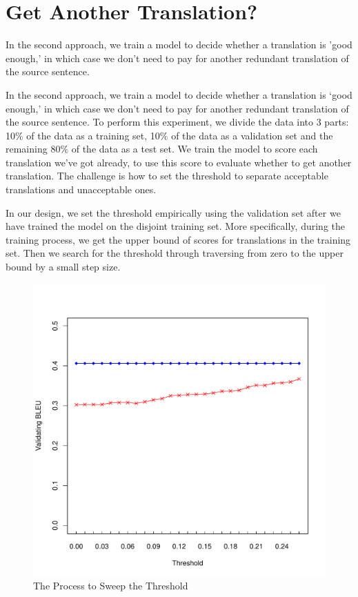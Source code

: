 \documentclass[11pt]{article}
\begin{document}
 
 \section{Get Another Translation?}
 
 In the second approach,  we train a model to decide whether a translation is 'good enough,' in which case we don't need to pay for another redundant  translation of the source sentence.  
 
 In the second approach,  we train a model to decide whether a translation  is `good enough,' in which case we don't need to  pay for another redundant translation of the source sentence.  To perform this experiment, we divide the data into 3 parts: 10$\%$ of the data as a training set, 10$\%$ of the data as a validation set and the remaining 80$\%$ of the data as a test set. We train the model to score each translation we've got already, to use this score to evaluate whether to get another translation. The challenge is how to set the threshold to separate acceptable translations and unacceptable ones. 
 
 
 In our design, we set the threshold empirically using the validation set after we have trained the model on the disjoint training set. More specifically, during the training process, we get the upper bound of scores for translations in the training set. Then we search for the threshold through traversing from  zero to the upper bound by a small step size. %
 
 \begin{figure}[htbp]
  \centering
  \includegraphics[width=\linewidth]{WorkerSelection/bleuthreshold.pdf}
  \caption{The Process to Sweep the Threshold}
    \label{fsweepthre}
\end{figure}
\end{document}
